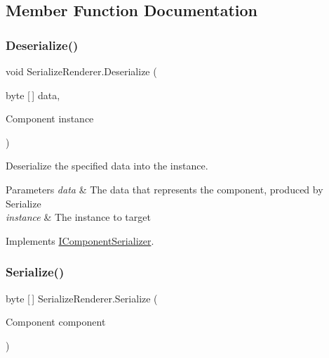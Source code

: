 \subsection{Member Function Documentation}
\mbox{\label{class_serialize_renderer_a98dc10a848db6d55165ce92ce5521c39}} 
\subsubsection{\texorpdfstring{Deserialize()}{Deserialize()}}
{\footnotesize\ttfamily void Serialize\+Renderer.\+Deserialize (\begin{DoxyParamCaption}\item[{byte \mbox{[}$\,$\mbox{]}}]{data,  }\item[{Component}]{instance }\end{DoxyParamCaption})\hspace{0.3cm}{\ttfamily [inline]}}



Deserialize the specified data into the instance. 


\begin{DoxyParams}{Parameters}
{\em data} & The data that represents the component, produced by Serialize \\
\hline
{\em instance} & The instance to target \\
\hline
\end{DoxyParams}


Implements \hyperlink{interface_i_component_serializer_a4cc366a5c78b33d47a90c209d8fed883}{I\+Component\+Serializer}.

\mbox{\label{class_serialize_renderer_afa879a8743291c478d35c50d9956c707}} 
\subsubsection{\texorpdfstring{Serialize()}{Serialize()}}
{\footnotesize\ttfamily byte \mbox{[}$\,$\mbox{]} Serialize\+Renderer.\+Serialize (\begin{DoxyParamCaption}\item[{Component}]{component }\end{DoxyParamCaption})\hspace{0.3cm}{\ttfamily [inline]}}



